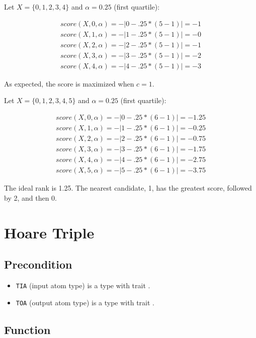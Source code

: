 \documentclass{article}
\begin{document}
Let $X = \{0,1,2,3,4\}$ and $\alpha = 0.25$ (first quartile):

\begin{align*}
    score(X, 0, \alpha) = -|0 - .25 * (5 - 1)| = -1 \\
    score(X, 1, \alpha) = -|1 - .25 * (5 - 1)| = -0 \\
    score(X, 2, \alpha) = -|2 - .25 * (5 - 1)| = -1 \\
    score(X, 3, \alpha) = -|3 - .25 * (5 - 1)| = -2 \\
    score(X, 4, \alpha) = -|4 - .25 * (5 - 1)| = -3
\end{align*}

As expected, the score is maximized when $c = 1$.

Let $X = \{0,1,2,3,4,5\}$ and $\alpha = 0.25$ (first quartile):

\begin{align*}
    score(X, 0, \alpha) = -|0 - .25 * (6 - 1)| = -1.25 \\
    score(X, 1, \alpha) = -|1 - .25 * (6 - 1)| = -0.25 \\
    score(X, 2, \alpha) = -|2 - .25 * (6 - 1)| = -0.75 \\
    score(X, 3, \alpha) = -|3 - .25 * (6 - 1)| = -1.75 \\
    score(X, 4, \alpha) = -|4 - .25 * (6 - 1)| = -2.75 \\
    score(X, 5, \alpha) = -|5 - .25 * (6 - 1)| = -3.75
\end{align*}

The ideal rank is 1.25. The nearest candidate, 1, has the greatest score, followed by 2, and then 0. 


\section{Hoare Triple}
\subsection*{Precondition}
\begin{itemize}
    \item \texttt{TIA} (input atom type) is a type with trait .
    \item \texttt{TOA} (output atom type) is a type with trait .
\end{itemize}


\subsection*{Function}
\label{sec:python-pseudocode}

\end{document}
